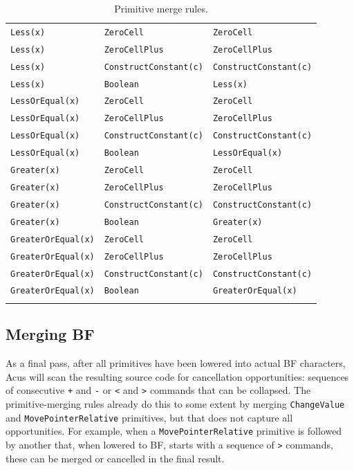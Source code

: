 \begin{longtable}{R{0.27\textwidth}|L{0.27\textwidth}|Q{0.34\textwidth}}
\texttt{Less(x)} & \texttt{ZeroCell} & \texttt{ZeroCell} \\
\texttt{Less(x)} & \texttt{ZeroCellPlus} & \texttt{ZeroCellPlus} \\
\texttt{Less(x)} & \texttt{ConstructConstant(c)} & \texttt{ConstructConstant(c)} \\
\texttt{Less(x)} & \texttt{Boolean} & \texttt{Less(x)} \\
\hline

\texttt{LessOrEqual(x)} & \texttt{ZeroCell} & \texttt{ZeroCell} \\
\texttt{LessOrEqual(x)} & \texttt{ZeroCellPlus} & \texttt{ZeroCellPlus} \\
\texttt{LessOrEqual(x)} & \texttt{ConstructConstant(c)} & \texttt{ConstructConstant(c)} \\
\texttt{LessOrEqual(x)} & \texttt{Boolean} & \texttt{LessOrEqual(x)} \\
\hline

\texttt{Greater(x)} & \texttt{ZeroCell} & \texttt{ZeroCell} \\
\texttt{Greater(x)} & \texttt{ZeroCellPlus} & \texttt{ZeroCellPlus} \\
\texttt{Greater(x)} & \texttt{ConstructConstant(c)} & \texttt{ConstructConstant(c)} \\
\texttt{Greater(x)} & \texttt{Boolean} & \texttt{Greater(x)} \\
\hline

\texttt{GreaterOrEqual(x)} & \texttt{ZeroCell} & \texttt{ZeroCell} \\
\texttt{GreaterOrEqual(x)} & \texttt{ZeroCellPlus} & \texttt{ZeroCellPlus} \\
\texttt{GreaterOrEqual(x)} & \texttt{ConstructConstant(c)} & \texttt{ConstructConstant(c)} \\
\texttt{GreaterOrEqual(x)} & \texttt{Boolean} & \texttt{GreaterOrEqual(x)} \\

\hline
\caption{Primitive merge rules.}
\label{tab:mergerules} 

\end{longtable}

\subsection{Merging BF}
As a final pass, after all primitives have been lowered into actual BF characters, Acus will scan the resulting source code for cancellation opportunities: sequences of consecutive \texttt{+} and \texttt{-} or \texttt{<} and \texttt{>} commands that can be collapsed. The primitive-merging rules already do this to some extent by merging \texttt{ChangeValue} and \texttt{MovePointerRelative} primitives, but that does not capture all opportunities. For example, when a \texttt{MovePointerRelative} primitive is followed by another that, when lowered to BF, starts with a sequence of \texttt{>} commands, these can be merged or cancelled in the final result.




